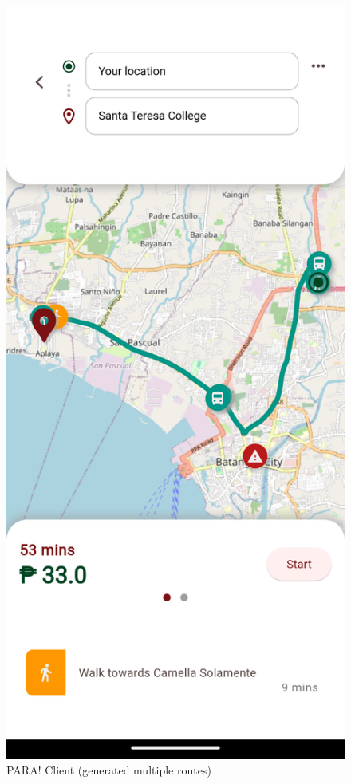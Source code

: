 \documentclass[journal]{./IEEE/IEEEtran}
\begin{document}
\begin{description}
\begin{figure}[h]
    \centering
        \includegraphics[scale=0.1]{./figures/client/multiple route.png}
    \caption{PARA! Client (generated multiple routes)}
\end{figure}


\end{description}
\end{document}
